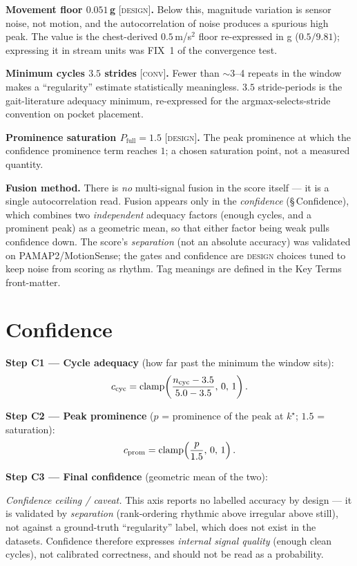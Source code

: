 \noindent\textbf{Movement floor $0.051$\,g} {\footnotesize\textsc{[design]}}\textbf{.}
Below this, magnitude variation is sensor noise, not motion, and the autocorrelation of
noise produces a spurious high peak. The value is the chest-derived $0.5$\,m/s$^2$ floor
re-expressed in g ($0.5/9.81$); expressing it in stream units was FIX~1 of the convergence
test.

\noindent\textbf{Minimum cycles $3.5$ strides} {\footnotesize\textsc{[conv]}}\textbf{.}
Fewer than $\sim$3--4 repeats in the window makes a ``regularity'' estimate statistically
meaningless. $3.5$ stride-periods is the gait-literature adequacy minimum, re-expressed for
the argmax-selects-stride convention on pocket placement.

\noindent\textbf{Prominence saturation $P_\text{full}=1.5$} {\footnotesize\textsc{[design]}}\textbf{.}
The peak prominence at which the confidence prominence term reaches $1$; a chosen saturation
point, not a measured quantity.

\noindent\textbf{Fusion method.}
There is \emph{no} multi-signal fusion in the score itself --- it is a single autocorrelation
read. Fusion appears only in the \emph{confidence} (\S\,Confidence), which combines two
\emph{independent} adequacy factors (enough cycles, and a prominent peak) as a geometric
mean, so that either factor being weak pulls confidence down. The score's \emph{separation}
(not an absolute accuracy) was validated on PAMAP2/MotionSense; the gates and confidence are
\textsc{design} choices tuned to keep noise from scoring as rhythm. Tag meanings are defined
in the Key Terms front-matter.

\section{Confidence}

\noindent\textbf{Step C1 --- Cycle adequacy} (how far past the minimum the window sits):
\[ c_\text{cyc} = \operatorname{clamp}\!\left(\frac{n_\text{cyc}-3.5}{5.0-3.5},\,0,\,1\right). \]

\noindent\textbf{Step C2 --- Peak prominence} ($p$ = prominence of the peak at $k^\star$;
$1.5$ = saturation):
\[ c_\text{prom} = \operatorname{clamp}\!\left(\frac{p}{1.5},\,0,\,1\right). \]

\noindent\textbf{Step C3 --- Final confidence} (geometric mean of the two):

\noindent\emph{Confidence ceiling / caveat.} This axis reports no labelled accuracy by
design --- it is validated by \emph{separation} (rank-ordering rhythmic above irregular
above still), not against a ground-truth ``regularity'' label, which does not exist in the
datasets. Confidence therefore expresses \emph{internal signal quality} (enough clean
cycles), not calibrated correctness, and should not be read as a probability.

